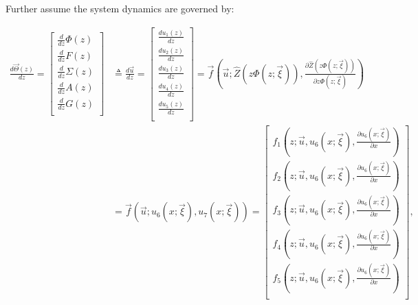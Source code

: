 \documentclass[11pt]{article}
\begin{document}
Further assume the system dynamics are governed by:

\begin{equation}
	\begin{split}
		\frac{{d\vec \Theta \left( z \right)}}{{dz}}  = \left[ {\begin{matrix}
			{\frac{d}{{dz}}\Phi \left( z \right)}  \\ 
			{\frac{d}{{dz}}F\left( z \right)}  \\ 
			{\frac{d}{{dz}}\Sigma \left( z \right)}  \\ 
			{\frac{d}{{dz}}A\left( z \right)}  \\ 
			{\frac{d}{{dz}}G\left( z \right)}  \\ 
			\end{matrix} } \right] & \triangleq \frac{{d\vec u}}{{dz}} =\left[ {\begin{matrix}
			{\frac{{d{u_1}\left( z \right)}}{{dz}}}  \\ 
			{\frac{{d{u_2}\left( z \right)}}{{dz}}}  \\ 
			{\frac{{d{u_3}\left( z \right)}}{{dz}}}  \\ 
			{\frac{{d{u_4}\left( z \right)}}{{dz}}}  \\ 
			{\frac{{d{u_5}\left( z \right)}}{{dz}}}  \\ 
			\end{matrix} } \right]  = {\vec f}\left( {\vec u;\widehat Z\left( {z\Phi \left( {z;\vec \xi  } \right)} \right),\frac{{\partial \widehat Z\left( {z\Phi \left( {z;\vec \xi  } \right)} \right)}}{{\partial z\Phi \left( {z;\vec \xi  } \right)}}} \right) \\
		& = {\vec f}\left( {\vec u;{u_6}\left( {x;\vec \xi  } \right),{u_7}\left( {x;\vec \xi  } \right)} \right) = \left[ {\begin{matrix}
			{{f_1}\left( {z;\vec u,{u_6}\left( {x;\vec \xi } \right),\frac{{\partial {u_6}\left( {x;\vec \xi } \right)}}{{\partial x}}} \right)}  \\ 
			{{f_2}\left( {z;\vec u,{u_6}\left( {x;\vec \xi } \right),\frac{{\partial {u_6}\left( {x;\vec \xi } \right)}}{{\partial x}}} \right)}  \\ 
			{{f_3}\left( {z;\vec u,{u_6}\left( {x;\vec \xi } \right),\frac{{\partial {u_6}\left( {x;\vec \xi } \right)}}{{\partial x}}} \right)}  \\ 
			{{f_4}\left( {z;\vec u,{u_6}\left( {x;\vec \xi } \right),\frac{{\partial {u_6}\left( {x;\vec \xi } \right)}}{{\partial x}}} \right)}  \\ 
			{{f_5}\left( {z;\vec u,{u_6}\left( {x;\vec \xi } \right),\frac{{\partial {u_6}\left( {x;\vec \xi } \right)}}{{\partial x}}} \right)}  \\ 
		\end{matrix} } \right], 
	\end{split}
\end{equation}
\end{document}
